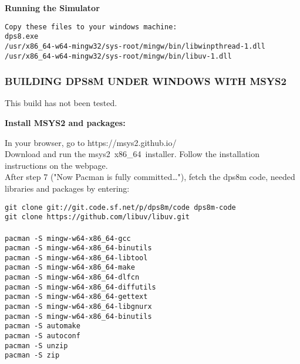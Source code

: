 \textbf{Running the Simulator}

\begin{adjustwidth}{5ex}{1ex}
    \texttt{Copy these files to your windows machine:} \\
    \texttt{dps8.exe} \\
    \texttt{/usr/x86\_64-w64-mingw32/sys-root/mingw/bin/libwinpthread-1.dll} \\
    \texttt{/usr/x86\_64-w64-mingw32/sys-root/mingw/bin/libuv-1.dll} \\
\end{adjustwidth}  

\newpage

\subsubsection[Building dps8m under Windows with MSYS2]{BUILDING DPS8M UNDER WINDOWS WITH MSYS2}

This build has not been tested.

\textbf{Install MSYS2 and packages:}

In your browser, go to https://msys2.github.io/ \\

Download and run the msys2\ x86\_64\ installer. Follow the installation
instructions on the webpage. \\

After step 7 ("Now Pacman is fully committed…"), fetch the dps8m
code, needed libraries and packages by entering: \\

\begin{adjustwidth}{5ex}{1ex}
	\texttt{git clone git://git.code.sf.net/p/dps8m/code dps8m-code} \\
    \texttt{git clone https://github.com/libuv/libuv.git} \\
    \\
    \texttt{pacman -S mingw-w64-x86\_64-gcc} \\
    \texttt{pacman -S mingw-w64-x86\_64-binutils} \\
    \texttt{pacman -S mingw-w64-x86\_64-libtool} \\
    \texttt{pacman -S mingw-w64-x86\_64-make} \\
    \texttt{pacman -S mingw-w64-x86\_64-dlfcn} \\
    \texttt{pacman -S mingw-w64-x86\_64-diffutils} \\
    \texttt{pacman -S mingw-w64-x86\_64-gettext} \\
    \texttt{pacman -S mingw-w64-x86\_64-libgnurx} \\
    \texttt{pacman -S mingw-w64-x86\_64-binutils} \\
    \texttt{pacman -S automake} \\
    \texttt{pacman -S autoconf} \\
    \texttt{pacman -S unzip} \\
    \texttt{pacman -S zip} \\
\end{adjustwidth}  

